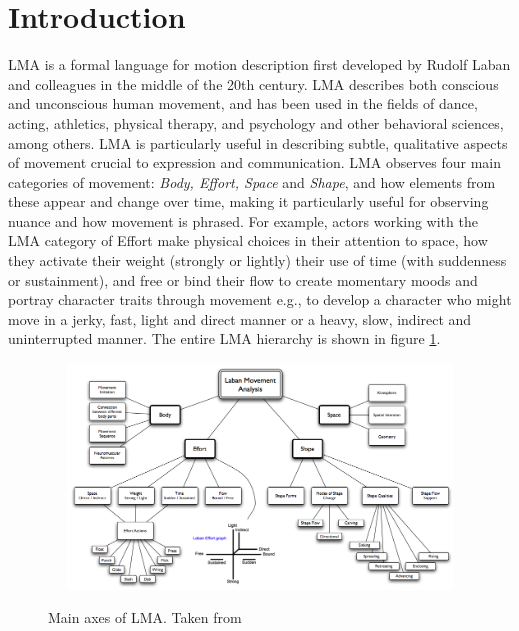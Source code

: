 \documentclass[11pt,twocolumn,varwidth=true,a4paper,fleqn]{sigchi}
\begin{document}
\section{Introduction}

LMA is a formal language for motion description first developed by Rudolf Laban \cite{Laban} and colleagues in the middle of the 20th century. LMA describes both conscious
and unconscious human movement, and has been used in
the fields of dance, acting, athletics, physical therapy, and
psychology and other behavioral sciences, among others.
LMA is particularly useful in describing subtle, qualitative
aspects of movement crucial to expression and
communication. LMA observes four main categories of
movement: \textit{Body, Effort, Space} and \textit{Shape}, and how
elements from these appear and change over time, making
it particularly useful for observing nuance and how
movement is phrased. For example, actors
working with the LMA category of Effort make physical
choices in their attention to space, how they activate their
weight (strongly or lightly) their use of time (with
suddenness or sustainment), and free or bind their flow to
create momentary moods and portray character traits
through movement e.g., to develop a character who might move in a jerky, fast, light and direct manner or a heavy, slow, indirect and uninterrupted manner.
The entire LMA hierarchy is shown in figure \ref{labanTree}.
\begin{figure}[ht]
\centering
\caption{Main axes of LMA. Taken from  }\cite{labanTree}
\includegraphics[width=13cm,height=6cm]{laban.png}
\label{labanTree}
\end{figure}
\end{document}
